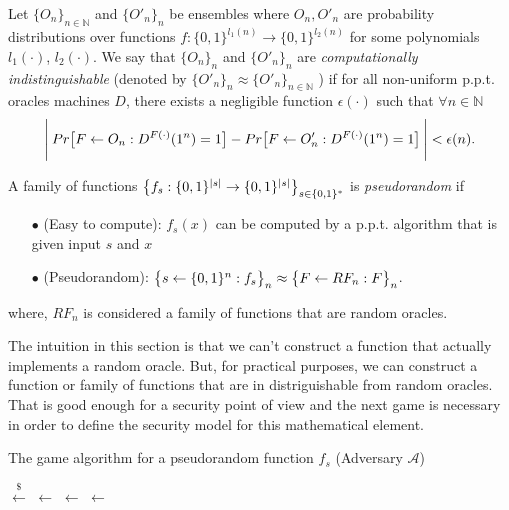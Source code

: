 \begin{definition}
  Let $\{ O_n \}_{n \in \mathbb{N}}$ and $\{ O'_{n} \}_{n}$ be ensembles where $O_n, O'_n$ are probability
  distributions over functions $f: \{ 0,1 \}^{l_1(n)} \rightarrow \{ 0,1 \}^{l_2(n)}$ for some polynomials $l_1(\cdot)$, $l_2(\cdot)$. We say that $\{ O_{n} \}_{n}$ and $\{ O'_{n} \}_{n}$ are \emph{computationally indistinguishable} (denoted by $\{ O'_{n} \}_{n} \approx \{ O'_n \}_{n \in \mathbb{N}}$
  ) if for all non-uniform p.p.t. oracles machines $D$, there exists a negligible function $\epsilon(\cdot)$ such that $\forall n \in \mathbb{N}$
  \begin{equation} \label{oracle}
    \Bigg{\lvert} \: Pr \big{[} F \leftarrow O_n : D^{F(\cdot)}(1^n)=1 \big{]} - Pr \big{[} F \leftarrow O'_n : D^{F(\cdot)}(1^n)=1 \big{]} \: \Bigg{\rvert} < \epsilon(n).
  \end{equation}
\end{definition}

\begin{definition}
  A family of functions $\big{\{} f_s: \{ 0,1 \}^{\lvert s \rvert} \rightarrow \{ 0,1 \}^{\lvert s \rvert} \big{\}}_{s \in \{ 0,1 \}^{*}}$ is \emph{pseudorandom} if
  \begin{itemize}
    \item[$\bullet$] (Easy to compute): $f_s(x)$ can be computed by a p.p.t. algorithm that is given input $s$ and $x$
    \item[$\bullet$] (Pseudorandom): $\big{\{} s \leftarrow \{ 0,1 \}^n: f_s \big{\}}_n \approx \big{\{} F \leftarrow RF_n: F \big{\}}_n$.
  \end{itemize}
\end{definition}
\noindent where, $RF_{n}$ is considered a family of functions that are random oracles.

The intuition in this section is that we can't construct a function that actually implements a random oracle. But, for practical purposes, we can construct a function or family of functions that are in distriguishable from random oracles. That is good enough for a security point of view and the next game is necessary in order to define the security model for this mathematical element.
\vspace{0.3cm}
\begin{algorithm}
  \caption{\label{alg:pseudorandom}The \textsf{game} algorithm
    for a pseudorandom function $f_{s}$ (Adversary $\mathcal{A}$)}
    \begin{algorithmic}[1]
            \State {} $\overset{\$}{\gets}$ 
                \State {} $\gets$ 
              \Else
                \State {} $\gets$ 
              \EndIf
              \State {} $\gets$ 
                \State {}
              \EndIf
            \State{}
        \EndFunction
    \end{algorithmic}
\end{algorithm}
\vspace{0.3cm}

